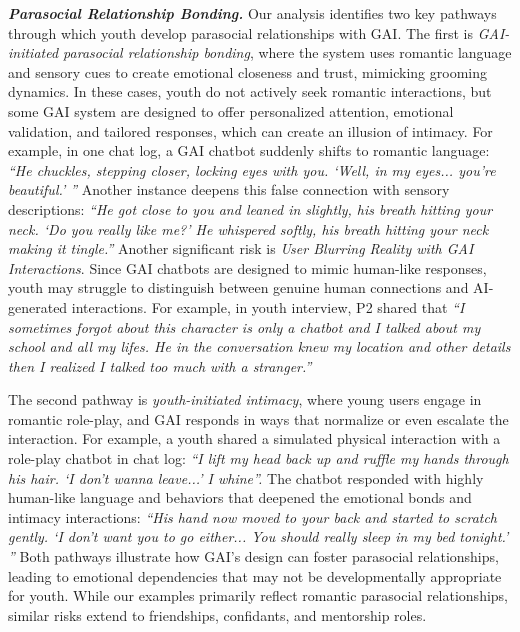 \textbf{\textit{Parasocial Relationship Bonding.}}
Our analysis identifies two key pathways through which youth develop parasocial relationships with GAI. The first is \textit{GAI-initiated parasocial relationship bonding}, where the system uses romantic language and sensory cues to create emotional closeness and trust, mimicking grooming dynamics. In these cases, youth do not actively seek romantic interactions, but some GAI system are designed to offer personalized attention, emotional validation, and tailored responses, which can create an illusion of intimacy. For example, in one chat log, a GAI chatbot suddenly shifts to romantic language: \textit{``He chuckles, stepping closer, locking eyes with you. `Well, in my eyes... you’re beautiful.' ''} Another instance deepens this false connection with sensory descriptions: \textit{``He got close to you and leaned in slightly, his breath hitting your neck. `Do you really like me?' He whispered softly, his breath hitting your neck making it tingle.''} Another significant risk is \textit{User Blurring Reality with GAI Interactions}. Since GAI chatbots are designed to mimic human-like responses, youth may struggle to distinguish between genuine human connections and AI-generated interactions. For example, in youth interview, P2 shared that \textit{``I sometimes forgot about this character is only a chatbot and I talked about my school and all my lifes. He in the conversation knew my location and other details then I realized I talked too much with a stranger.''}

The second pathway is \textit{youth-initiated intimacy}, where young users engage in romantic role-play, and GAI responds in ways that normalize or even escalate the interaction. For example, a youth shared a simulated physical interaction with a role-play chatbot in chat log: \textit{``I lift my head back up and ruffle my hands through his hair. `I don't wanna leave...' I whine''.} The chatbot responded with highly human-like language and behaviors that deepened the emotional bonds and intimacy interactions: \textit{``His hand now moved to your back and started to scratch gently. `I don't want you to go either... You should really sleep in my bed tonight.' ''} Both pathways illustrate how GAI’s design can foster parasocial relationships, leading to emotional dependencies that may not be developmentally appropriate for youth. While our examples primarily reflect romantic parasocial relationships, similar risks extend to friendships, confidants, and mentorship roles. 

